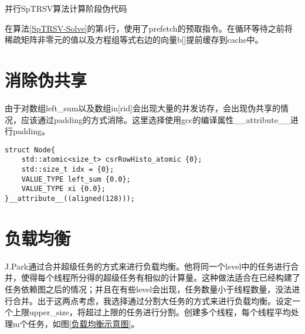 \begin{algorithm}[htbp]
    \caption{并行SpTRSV算法计算阶段伪代码\label{SpTRSV-Solve}}
\end{algorithm}

在算法\ref{SpTRSV-Solve}的第4行，使用了prefetch的预取指令。在循环等待之前将稀疏矩阵非零元的值以及方程组等式右边的向量b[]提前缓存到cache中。

\section{消除伪共享}

由于对数组left\_sum以及数组in[rid]会出现大量的并发访存，会出现伪共享的情况，应该通过padding的方式消除。这里选择使用gcc的编译属性\_\_attribute\_\_进行padding。

\begin{lstlisting}[caption={消除伪共享}]
struct Node{
    std::atomic<size_t> csrRowHisto_atomic {0};
    std::size_t idx = {0};
    VALUE_TYPE left_sum {0.0};
    VALUE_TYPE xi {0.0};
}__attribute__((aligned(128)));
\end{lstlisting}

\section{负载均衡}\label{section:fuzaijunheng}

J.Park\cite{park2014sparsifying}通过合并超级任务的方式来进行负载均衡。他将同一个level中的任务进行合并，使得每个线程所分得的超级任务有相似的计算量。这种做法适合在已经构建了任务依赖图之后的情况；并且在有些level会出现，任务数量小于线程数量，没法进行合并。出于这两点考虑，我选择通过分割大任务的方式来进行负载均衡。设定一个上限upper\_size，将超过上限的任务进行分割。创建多个线程，每个线程平均处理m个任务，如图\ref{负载均衡示意图}。

